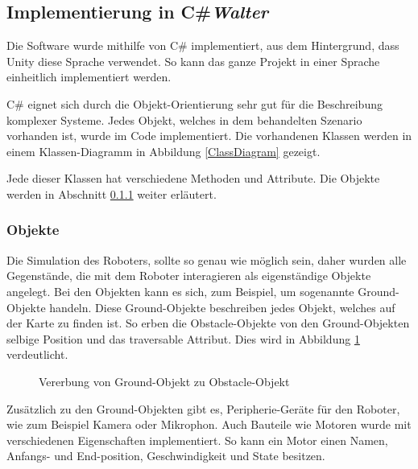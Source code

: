 \subsection{Implementierung in C\#\hfill\textnormal{\emph{Walter}}}
Die Software wurde mithilfe von C\# implementiert, aus dem Hintergrund, dass Unity diese Sprache verwendet. So kann das ganze Projekt in einer Sprache einheitlich implementiert werden.  

C\# eignet sich durch die Objekt-Orientierung sehr gut für die Beschreibung komplexer Systeme. Jedes Objekt, welches in dem behandelten Szenario vorhanden ist, wurde im Code implementiert. Die vorhandenen Klassen werden in einem Klassen-Diagramm in Abbildung \ref{ClassDiagram} gezeigt.

Jede dieser Klassen hat verschiedene Methoden und Attribute. Die Objekte werden in Abschnitt \ref{obj} weiter erläutert. 

\subsubsection{Objekte}
\label{obj}
Die Simulation des Roboters, sollte so genau wie möglich sein, daher wurden alle Gegenstände, die mit dem Roboter interagieren als eigenständige Objekte angelegt. Bei den Objekten kann es sich, zum Beispiel, um sogenannte Ground-Objekte handeln. Diese Ground-Objekte beschreiben jedes Objekt, welches auf der Karte zu finden ist. So erben die Obstacle-Objekte von den Ground-Objekten selbige Position und das traversable Attribut. Dies wird in Abbildung \ref{erben} verdeutlicht. 

\begin{figure}[H]
  \caption{Vererbung von Ground-Objekt zu Obstacle-Objekt}
  \label{erben}
\end{figure}
Zusätzlich zu den Ground-Objekten gibt es, Peripherie-Geräte für den Roboter, wie zum Beispiel Kamera oder Mikrophon. Auch Bauteile wie Motoren wurde mit verschiedenen Eigenschaften implementiert. So kann ein Motor einen Namen, Anfangs- und End-position, Geschwindigkeit und State besitzen.

